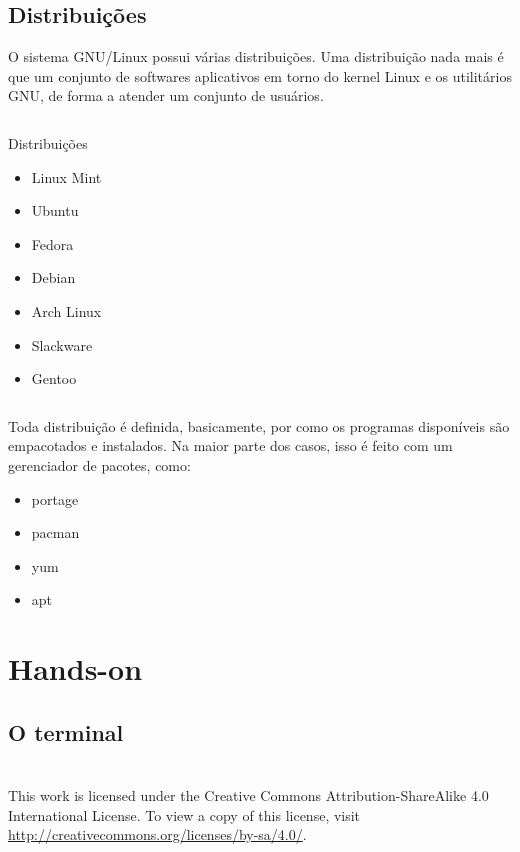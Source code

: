 \documentclass{beamer}
\begin{document}
\subsection{Distribuições}

\begin{frame}
  O sistema GNU/Linux possui várias distribuições. Uma distribuição
  nada mais é que um conjunto de softwares aplicativos em torno do
  kernel Linux e os utilitários GNU, de forma a atender um conjunto
  de usuários.

  \begin{columns}

    \begin{block}{Distribuições}
      \begin{itemize}
      \item Linux Mint
      \item Ubuntu
      \item Fedora
      \item Debian
      \item Arch Linux
      \item Slackware
      \item Gentoo
      \end{itemize}
    \end{block}

  \end{columns}

\end{frame}

\begin{frame}

  Toda distribuição é definida, basicamente, por como os programas
  disponíveis são empacotados e instalados. Na maior parte dos casos,
  isso é feito com um gerenciador de pacotes, como:

  \begin{itemize}
  \item portage
  \item pacman
  \item yum
  \item apt
  \end{itemize}

\end{frame}

\section{Hands-on}
\subsection{O terminal}

\frame{}

\section{}

\begin{frame}
  This work is licensed under the Creative Commons Attribution-ShareAlike 4.0 International License. To view a copy of this license, visit \url{http://creativecommons.org/licenses/by-sa/4.0/}.
\end{frame}
\end{document}
